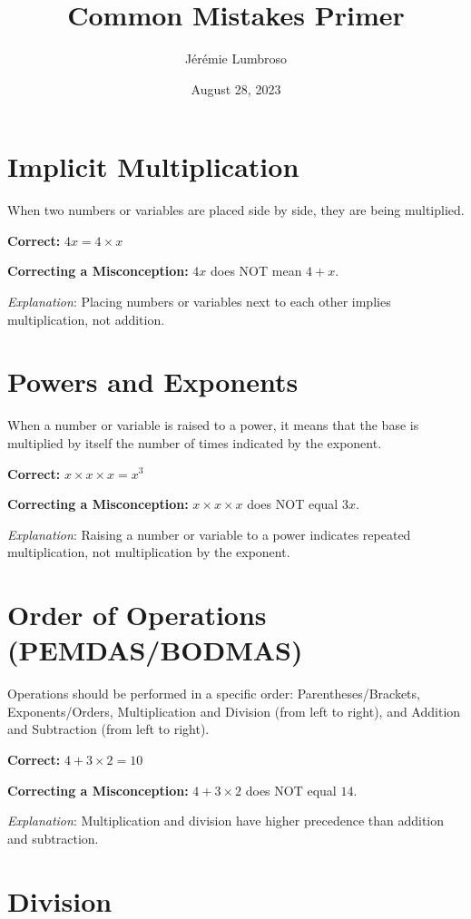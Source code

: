\documentclass[12pt]{article}
\title{Common Mistakes Primer}
\author{Jérémie Lumbroso}
\date{August 28, 2023}
\begin{document}
\maketitle

\section*{Implicit Multiplication}

When two numbers or variables are placed side by side, they are being multiplied.

\textbf{Correct:} \(4x = 4 \times x\)

\textbf{Correcting a Misconception:} \(4x\) does NOT mean \(4 + x\).

\textit{Explanation}: Placing numbers or variables next to each other implies multiplication, not addition.

\section*{Powers and Exponents}

When a number or variable is raised to a power, it means that the base is multiplied by itself the number of times indicated by the exponent.

\textbf{Correct:} \(x \times x \times x = x^3\)

\textbf{Correcting a Misconception:} \(x \times x \times x\) does NOT equal \(3x\).

\textit{Explanation}: Raising a number or variable to a power indicates repeated multiplication, not multiplication by the exponent.

\section*{Order of Operations (PEMDAS/BODMAS)}

Operations should be performed in a specific order: Parentheses/Brackets, Exponents/Orders, Multiplication and Division (from left to right), and Addition and Subtraction (from left to right).

\textbf{Correct:} \(4 + 3 \times 2 = 10\)

\textbf{Correcting a Misconception:} \(4 + 3 \times 2\) does NOT equal \(14\).

\textit{Explanation}: Multiplication and division have higher precedence than addition and subtraction.

\section*{Division}
\end{document}
